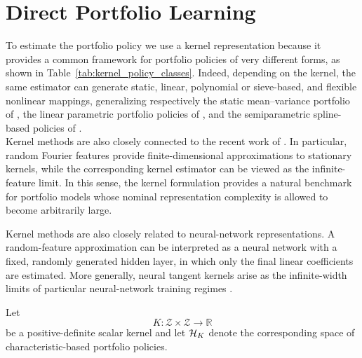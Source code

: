\section{Direct Portfolio Learning}
\label{sec:direct_learning}
To estimate the portfolio policy we use a kernel representation \citet{filipovicschneider2024,nagel2025} because it provides a common framework for
portfolio policies of very different forms, as shown in Table~\ref{tab:kernel_policy_classes}. 
Indeed, depending on the kernel, the same estimator can generate static, linear,
polynomial or sieve-based, and flexible nonlinear mappings, generalizing respectively the static mean--variance portfolio of \citet{brittenjones1999}, the linear parametric portfolio
policies of \citet{brandtsantaclaravalkanov2009}, and the semiparametric
spline-based policies of \citet{caldeirasantostorrent2023}.\\
Kernel methods are also closely connected to the recent work of
\citet{nagel2025,kellymalamud2025}. In particular, random Fourier features
\citep{rahimi2007random} provide finite-dimensional approximations to
stationary kernels, while the corresponding kernel estimator can be viewed as
the infinite-feature limit. In this sense, the kernel formulation provides a
natural benchmark for portfolio models whose nominal representation complexity
is allowed to become arbitrarily large.

Kernel methods are also closely related to neural-network representations.
A random-feature approximation can be interpreted as a neural network with a
fixed, randomly generated hidden layer, in which only the final linear
coefficients are estimated. More generally, neural tangent kernels arise as
the infinite-width limits of particular neural-network training regimes
\citep{jacot2018neural}.

Let
\[
K:\mathscr Z\times\mathscr Z\rightarrow\mathbb R
\]
be a positive-definite scalar kernel and let $\mathcal{H}_K$ denote the corresponding
space of characteristic-based portfolio policies.

